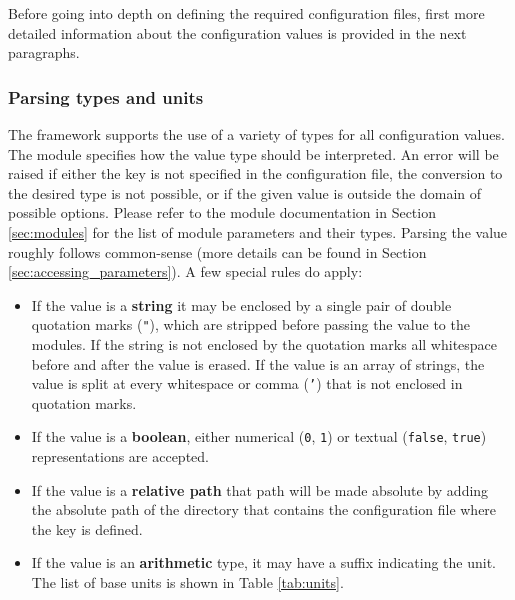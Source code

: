 Before going into depth on defining the required configuration files, first more detailed information about the configuration values is provided in the next paragraphs.

\subsubsection{Parsing types and units}
\label{sec:config_values}
The \apsq framework supports the use of a variety of types for all configuration values. The module specifies how the value type should be interpreted. An error will be raised if either the key is not specified in the configuration file, the conversion to the desired type is not possible, or if the given value is outside the domain of possible options. Please refer to the module documentation in Section \ref{sec:modules} for the list of module parameters and their types. Parsing the value roughly follows common-sense (more details can be found in Section \ref{sec:accessing_parameters}). A few special rules do apply:
\begin{itemize}
\item If the value is a \textbf{string} it may be enclosed by a single pair of double quotation marks (\texttt{"}), which are stripped before passing the value to the modules. If the string is not enclosed by the quotation marks all whitespace before and after the value is erased. If the value is an array of strings, the value is split at every whitespace or comma (\texttt{'}) that is not enclosed in quotation marks.
\item If the value is a \textbf{boolean}, either numerical (\texttt{0}, \texttt{1}) or textual (\texttt{false}, \texttt{true}) representations are accepted.
\item If the value is a \textbf{relative path} that path will be made absolute by adding the absolute path of the directory that contains the configuration file where the key is defined.
\item If the value is an \textbf{arithmetic} type, it may have a suffix indicating the unit. The list of base units is shown in Table \ref{tab:units}. 
\end{itemize}

